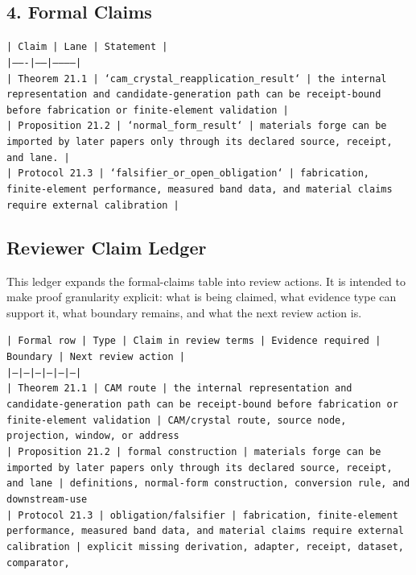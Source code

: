 \documentclass[11pt]{article}
\begin{document}
\subsection*{4. Formal Claims}

\noindent\texttt{| Claim | Lane | Statement |}\\
\noindent\texttt{|-------|------|-----------|}\\
\noindent\texttt{| Theorem 21.1 | `cam\_crystal\_reapplication\_result` | the internal representation and candidate-generation path can be receipt-bound before fabrication or finite-element validation |}\\
\noindent\texttt{| Proposition 21.2 | `normal\_form\_result` | materials forge can be imported by later papers only through its declared source, receipt, and lane. |}\\
\noindent\texttt{| Protocol 21.3 | `falsifier\_or\_open\_obligation` | fabrication, finite-element performance, measured band data, and material claims require external calibration |}\\

\subsection*{Reviewer Claim Ledger}

This ledger expands the formal-claims table into review actions. It is intended to make proof granularity explicit: what is being claimed, what evidence type can support it, what boundary remains, and what the next review action is.

\noindent\texttt{| Formal row | Type | Claim in review terms | Evidence required | Boundary | Next review action |}\\
\noindent\texttt{|---|---|---|---|---|---|}\\
\noindent\texttt{| Theorem 21.1 | CAM route | the internal representation and candidate-generation path can be receipt-bound before fabrication or finite-element validation | CAM/crystal route, source node, projection, window, or address}\\
\noindent\texttt{| Proposition 21.2 | formal construction | materials forge can be imported by later papers only through its declared source, receipt, and lane | definitions, normal-form construction, conversion rule, and downstream-use }\\
\noindent\texttt{| Protocol 21.3 | obligation/falsifier | fabrication, finite-element performance, measured band data, and material claims require external calibration | explicit missing derivation, adapter, receipt, dataset, comparator,}\\
\end{document}

